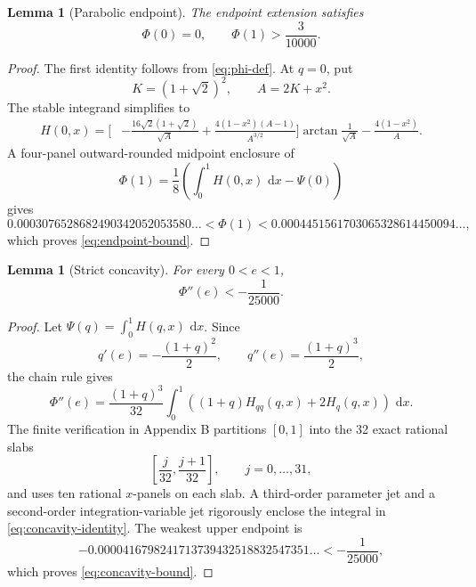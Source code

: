 \documentclass[11pt]{article}
\numberwithin{equation}{section}
\newtheorem{lemma}[theorem]{Lemma}
\theoremstyle{remark}
\newcommand{\dd}{\,\mathrm d}
\begin{document}
\begin{lemma}[Parabolic endpoint]
\label{lem:parabolic-endpoint}
The endpoint extension satisfies
\begin{equation}
  \Phi(0)=0,
  \qquad
  \Phi(1)>\frac3{10000}.
  \label{eq:endpoint-bound}
\end{equation}
\end{lemma}

\begin{proof}
The first identity follows from \eqref{eq:phi-def}. At \(q=0\), put
\[
  K=(1+\sqrt2)^2,
  \qquad
  A=2K+x^2.
\]
The stable integrand simplifies to
\begin{equation}
\begin{aligned}
H(0,x)=\bigg[&-\frac{16\sqrt2(1+\sqrt2)}{\sqrt A}
 +\frac{4(1-x^2)(A-1)}{A^{3/2}}\bigg]
 \arctan\frac1{\sqrt A}
 -\frac{4(1-x^2)}A.
\end{aligned}
\label{eq:endpoint-integrand}
\end{equation}
A four-panel outward-rounded midpoint enclosure of
\[
  \Phi(1)=\frac18\left(\int_0^1H(0,x)\,\dd x-\Psi(0)\right)
\]
gives
\[
0.0003076528682490342052053580\ldots
<\Phi(1)<
0.0004451561703065328614450094\ldots,
\]
which proves \eqref{eq:endpoint-bound}.
\end{proof}

\begin{lemma}[Strict concavity]
\label{lem:concavity}
For every \(0<e<1\),
\begin{equation}
  \Phi''(e)<-\frac1{25000}.
  \label{eq:concavity-bound}
\end{equation}
\end{lemma}

\begin{proof}
Let \(\Psi(q)=\int_0^1H(q,x)\,\dd x\). Since
\[
q'(e)=-\frac{(1+q)^2}{2},
\qquad
q''(e)=\frac{(1+q)^3}{2},
\]
the chain rule gives
\begin{equation}
  \Phi''(e)=\frac{(1+q)^3}{32}
  \int_0^1\left((1+q)H_{qq}(q,x)+2H_q(q,x)\right)\,\dd x.
  \label{eq:concavity-identity}
\end{equation}
The finite verification in Appendix B partitions \([0,1]\) into the 32 exact rational slabs
\[
  \left[\frac j{32},\frac{j+1}{32}\right],
  \qquad j=0,\ldots,31,
\]
and uses ten rational \(x\)-panels on each slab. A third-order parameter jet and a second-order integration-variable jet rigorously enclose the integral in \eqref{eq:concavity-identity}. The weakest upper endpoint is
\[
-0.0000416798241713739432518832547351\ldots
<-\frac1{25000},
\]
which proves \eqref{eq:concavity-bound}.
\end{proof}
\end{document}
